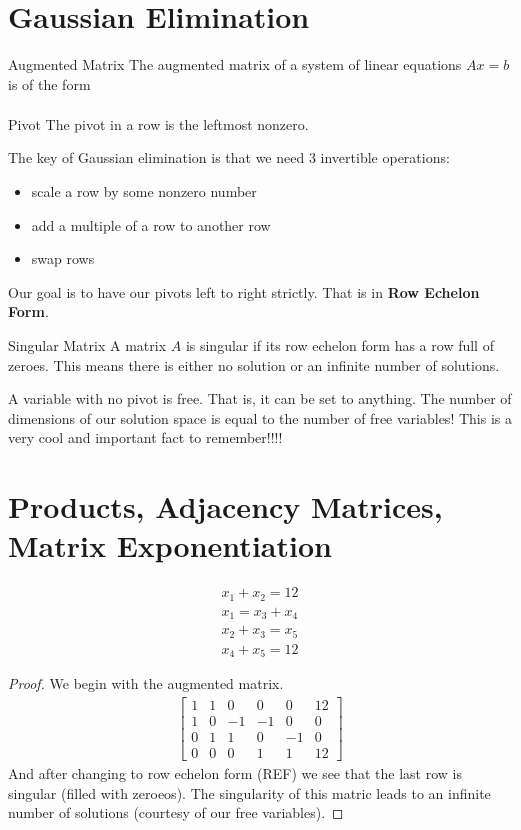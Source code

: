 \documentclass[11pt]{article}
\begin{document}
\section{Gaussian Elimination}
\begin{definitionbox}{Augmented Matrix}
    The augmented matrix of a system of linear equations $Ax=b$ is of the form
    \begin{align*}
        [A|b]
    \end{align*}
\end{definitionbox}
\begin{definitionbox}{Pivot}
    The pivot in a row is the leftmost nonzero.
\end{definitionbox}

The key of Gaussian elimination is that we need 3 invertible operations:
\begin{itemize}
    \item scale a row by some nonzero number
    \item add a multiple of a row to another row
    \item swap rows
\end{itemize}
Our goal is to have our pivots left to right strictly. That is in \textbf{Row Echelon Form}.
\begin{definitionbox}{Singular Matrix}
    A matrix $A$ is singular if its row echelon form has a row full of zeroes. This means there is either no solution or an infinite number of solutions.
\end{definitionbox}
A variable with no pivot is free. That is, it can be set to anything. The number of dimensions of our solution space is equal to the number of free variables! This is a very cool and important fact to remember!!!!

\section{Products, Adjacency Matrices, Matrix Exponentiation}
\begin{examplebox}{}
    \begin{align}
        x_1+x_2=12 \\
        x_1=x_3+x_4 \\
        x_2+x_3=x_5 \\
        x_4+x_5=12
    \end{align}
\end{examplebox}
\begin{proof}
    We begin with the augmented matrix.
    \begin{align*}
        \begin{bmatrix}
            1 & 1 & 0 & 0 & 0 & 12 \\
            1 & 0 & -1 & -1 & 0 & 0\\
            0 & 1 & 1 & 0 & -1 & 0\\
            0 & 0 & 0 & 1 & 1 & 12
        \end{bmatrix}
    \end{align*}
    And after changing to row echelon form (REF) we see that the last row is singular (filled with zeroeos). The singularity of this matric leads to an infinite number of solutions (courtesy of our free variables). 
\end{proof}
\end{document}
